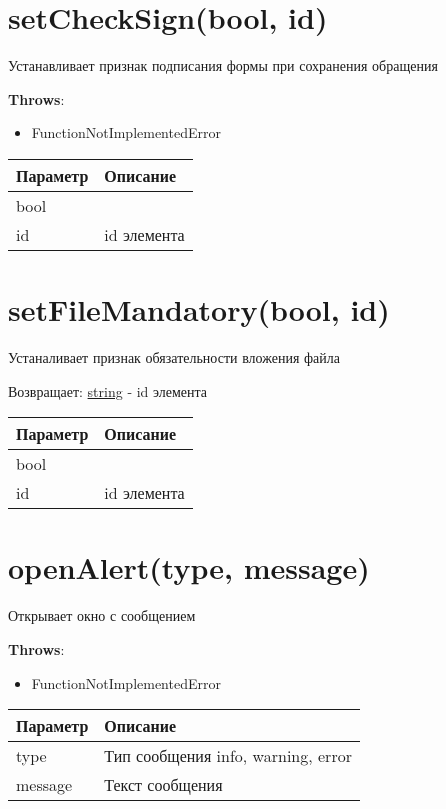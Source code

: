 \hypertarget{setchecksignbool-id}{%
\section{setCheckSign(bool, id)}\label{setchecksignbool-id}}

Устанавливает признак подписания формы при сохранения обращения

\textbf{Throws}:

\begin{itemize}
\tightlist
\item
  FunctionNotImplementedError
\end{itemize}

\begin{longtable}[]{@{}ll@{}}
\toprule
Параметр & Описание\tabularnewline
\midrule
\endhead
bool &\tabularnewline
id & id элемента\tabularnewline
\bottomrule
\end{longtable}

\hypertarget{setfilemandatorybool-id-string}{%
\section{setFileMandatory(bool, id)}\label{setfilemandatorybool-id-string}}

Устаналивает признак обязательности вложения файла

Возвращает: \protect\hyperlink{string}{string} - id элемента

\begin{longtable}[]{@{}ll@{}}
\toprule
Параметр & Описание\tabularnewline
\midrule
\endhead
bool &\tabularnewline
id & id элемента\tabularnewline
\bottomrule
\end{longtable}

\hypertarget{openalerttype-message}{%
\section{openAlert(type, message)}\label{openalerttype-message}}

Открывает окно с сообщением

\textbf{Throws}:

\begin{itemize}
\tightlist
\item
  FunctionNotImplementedError
\end{itemize}

\begin{longtable}[]{@{}ll@{}}
\toprule
Параметр & Описание\tabularnewline
\midrule
\endhead
type & Тип сообщения info, warning, error\tabularnewline
message & Текст сообщения\tabularnewline
\bottomrule
\end{longtable}

